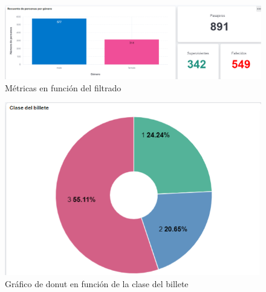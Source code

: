\begin{figure}
    \centering
    \includegraphics[width=1\linewidth]{img/graficos1.png}
    \caption{Métricas en función del filtrado}
    \label{fig:metricas1}
\end{figure}

\begin{figure}
    \centering
    \includegraphics[width=1\linewidth]{img/donut.png}
    \caption{Gráfico de donut en función de la clase del billete}
    \label{fig:donut1}
\end{figure}

\paragraph{}
\paragraph{}
\paragraph{}
\paragraph{}
\paragraph{}
